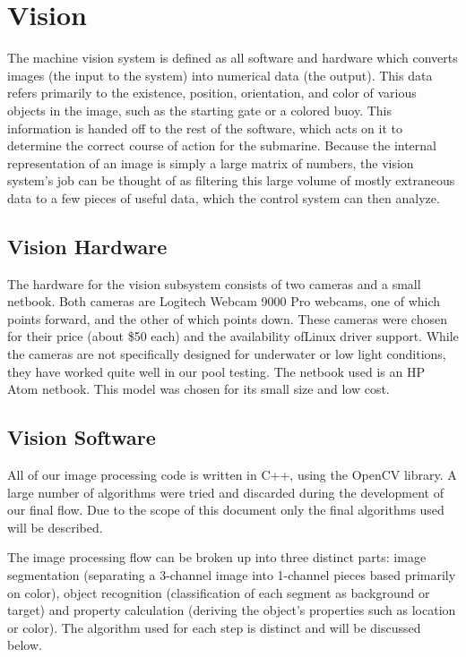\section{Vision}
The machine vision system is defined as all software and hardware which converts images (the input to the system) into numerical data (the output). This data refers primarily to the existence, position, orientation, and color of various objects in the image, such as the starting gate or a colored buoy. This information is handed off to the rest of the software, which acts on it to determine the correct course of action for the submarine. Because the internal representation of an image is simply a large matrix of numbers, the vision system's job can be thought of as filtering this large volume of mostly extraneous data to a few pieces of useful data, which the control system can then analyze.

\subsection{Vision Hardware}
The hardware for the vision subsystem consists of two cameras and a small netbook. Both cameras are Logitech Webcam 9000 Pro webcams, one of which points forward, and the other of which points down. These cameras were chosen for their price (about \$50 each) and the availability ofLinux driver support. While the cameras are not specifically designed for underwater or low light conditions, they have worked quite well in our pool testing. The netbook used is an HP Atom netbook. This model was chosen for its small size and low cost.

\subsection{Vision Software}
All of our image processing code is written in C++, using the OpenCV library. A large number of algorithms were tried and discarded during the development of our final flow.  Due to the scope of this document only the final algorithms used will be described.

The image processing flow can be broken up into three distinct parts: image segmentation (separating a 3-channel image into 1-channel pieces based primarily on color), object recognition (classification of each segment as background or target) and property calculation (deriving the object's properties such as location or color). The algorithm used for each step is distinct and will be discussed below.

